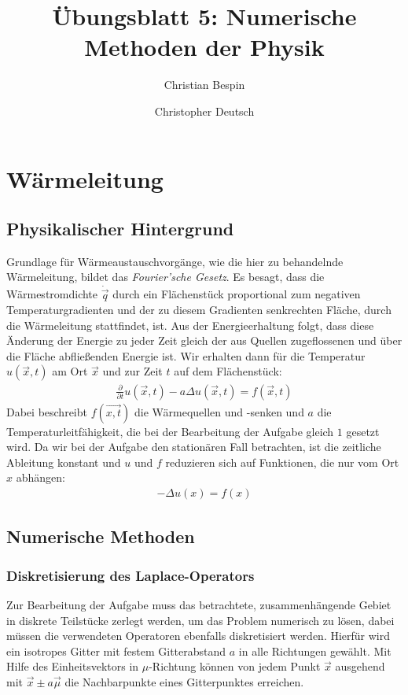 \documentclass[10pt,a4paper]{article}
\author{Christian Bespin \and Christopher Deutsch}
\title{Übungsblatt 5: Numerische Methoden der Physik}
\begin{document}
\maketitle

\setcounter{section}{4}

\section{Wärmeleitung}

\subsection{Physikalischer Hintergrund}
Grundlage für Wärmeaustauschvorgänge, wie die hier zu behandelnde Wärmeleitung, bildet das \emph{Fourier'sche Gesetz}. Es besagt, dass die Wärmestromdichte $\dot{\vec{q}}$ durch ein Flächenstück proportional zum negativen Temperaturgradienten und der zu diesem Gradienten senkrechten Fläche, durch die Wärmeleitung stattfindet, ist. Aus der Energieerhaltung folgt, dass diese Änderung der Energie zu jeder Zeit gleich der aus Quellen zugeflossenen und über die Fläche abfließenden Energie ist. Wir erhalten dann für die Temperatur $u(\vec{x},t)$ am Ort $\vec{x}$ und zur Zeit $t$ auf dem Flächenstück:
\begin{align}  
\frac{\partial}{\partial t}u(\vec{x},t)-a \Delta u(\vec{x},t)=f(\vec{x},t)
\end{align}
Dabei beschreibt $f(\vec{x,t})$ die Wärmequellen und -senken und $a$ die Temperaturleitfähigkeit, die bei der Bearbeitung der Aufgabe gleich $1$ gesetzt wird. Da wir bei der Aufgabe den stationären Fall betrachten, ist die zeitliche Ableitung konstant und $u$ und $f$ reduzieren sich auf Funktionen, die nur vom Ort $x$ abhängen:
\begin{align}
-\Delta u(x)=f(x)
\label{eqn:dgl}
\end{align}

\subsection{Numerische Methoden}
\subsubsection{Diskretisierung des Laplace-Operators}
Zur Bearbeitung der Aufgabe muss das betrachtete, zusammenhängende Gebiet in diskrete Teilstücke zerlegt werden, um das Problem numerisch zu lösen, dabei müssen die verwendeten Operatoren ebenfalls diskretisiert werden. Hierfür wird ein isotropes Gitter mit festem Gitterabstand $a$ in alle Richtungen gewählt. Mit Hilfe des Einheitsvektors in $\mu$-Richtung können von jedem Punkt $\vec{x}$ ausgehend mit $\vec{x} \pm a\vec{\mu}$ die Nachbarpunkte eines Gitterpunktes erreichen.
\end{document}
